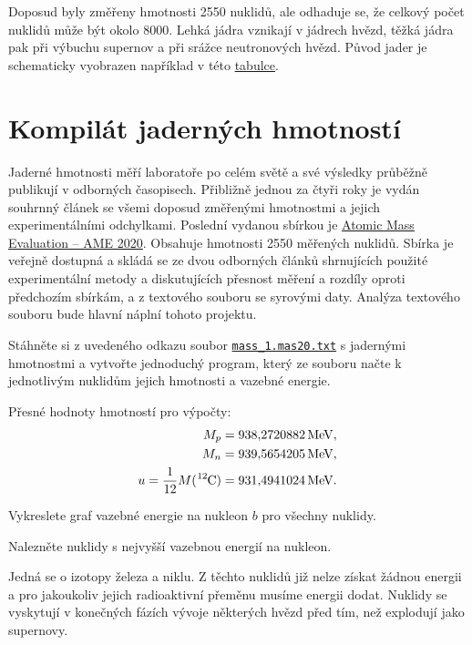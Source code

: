 \documentclass[a4paper,12pt,oneside]{article}
\def\unit#1{\,\mathrm{#1}}
\def\c{,\!}                             %
\def\file#1#2{\textnormal{{\texttt{\href{#1}{#2}}}}}
\theoremstyle{red}
\begin{document}
    Doposud byly změřeny hmotnosti 2550 nuklidů, ale odhaduje se, že celkový počet nuklidů může být okolo 8000.
    Lehká jádra vznikají v jádrech hvězd, těžká jádra pak při výbuchu supernov a při srážce neutronových hvězd. 
    Původ jader je schematicky vyobrazen například v této \href{https://upload.wikimedia.org/wikipedia/commons/3/31/Nucleosynthesis_periodic_table.svg}{tabulce}.

\section{Kompilát jaderných hmotností}
    Jaderné hmotnosti měří laboratoře po celém světě a své výsledky průběžně publikují v odborných časopisech.
    Přibližně jednou za čtyři roky je vydán souhrnný článek se všemi doposud změřenými hmotnostmi a jejich experimentálními odchylkami.
    Poslední vydanou sbírkou je \href{https://www-nds.iaea.org/amdc/}{Atomic Mass Evaluation -- AME 2020}.
    Obsahuje hmotnosti 2550 měřených nuklidů.
    Sbírka je veřejně dostupná a skládá se ze dvou odborných článků shrnujících použité experimentální metody a diskutujících přesnost měření a rozdíly oproti předchozím sbírkám, a z textového souboru se syrovými daty.
    Analýza textového souboru bude hlavní náplní tohoto projektu.

    \begin{task}
        Stáhněte si z uvedeného odkazu soubor \file{https://www-nds.iaea.org/amdc/ame2020/mass_1.mas20.txt}{mass\_1.mas20.txt} s jadernými hmotnostmi a vytvořte jednoduchý program, který ze souboru načte k jednotlivým nuklidům jejich hmotnosti a vazebné energie.
    \end{task}

    Přesné hodnoty hmotností pro výpočty:
    \begin{align}
        M_{p}&=938\c2720882\unit{MeV},\\
        M_{n}&=939\c5654205\unit{MeV},\\
        u=\frac{1}{12}M(\ce{^{12}C})&=931\c4941024\unit{MeV}.
    \end{align}

    \begin{task}
        \label{task:b}
        Vykreslete graf vazebné energie na nukleon $b$ pro všechny nuklidy.
    \end{task}

    \begin{task}
        Nalezněte nuklidy s nejvyšší vazebnou energií na nukleon.
    \end{task}
    Jedná se o izotopy železa a niklu.
    Z těchto nuklidů již nelze získat žádnou energii a pro jakoukoliv jejich radioaktivní přeměnu musíme energii dodat.
    Nuklidy se vyskytují v konečných fázích vývoje některých hvězd před tím, než explodují jako supernovy.
\end{document}
